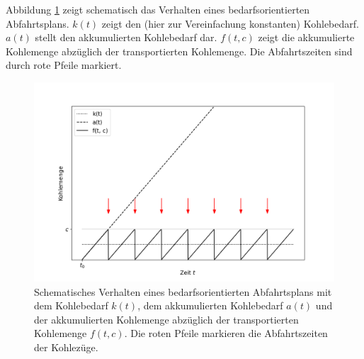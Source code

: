 Abbildung \ref{fig:demand-math} zeigt schematisch das Verhalten eines bedarfsorientierten Abfahrtsplans. $k(t)$ zeigt den (hier zur Vereinfachung konstanten) Kohlebedarf. $a(t)$ stellt den akkumulierten Kohlebedarf dar. $f(t,c)$ zeigt die akkumulierte Kohlemenge abzüglich der transportierten Kohlemenge. Die Abfahrtszeiten sind durch rote Pfeile markiert.

\begin{figure}[htb]
	\centering
	\includegraphics[width=1.0\linewidth]{images/demand-math.png}
	\caption{Schematisches Verhalten eines bedarfsorientierten Abfahrtsplans mit dem Kohlebedarf $k(t)$, dem akkumulierten Kohlebedarf $a(t)$ und der akkumulierten Kohlemenge abzüglich der transportierten Kohlemenge $f(t,c)$. Die roten Pfeile markieren die Abfahrtszeiten der Kohlezüge.}
	\label{fig:demand-math}
\end{figure}